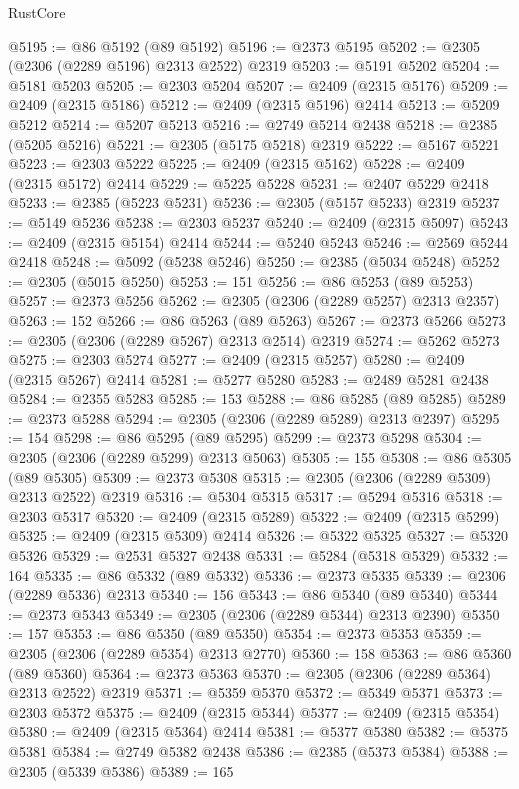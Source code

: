 \begin{lexlean}{RustCore}
\begin{coremodule}
@5195 := @86 @5192 (@89 @5192)
@5196 := @2373 @5195
@5202 := @2305 (@2306 (@2289 @5196) @2313 @2522) @2319
@5203 := @5191 @5202
@5204 := @5181 @5203
@5205 := @2303 @5204
@5207 := @2409 (@2315 @5176)
@5209 := @2409 (@2315 @5186)
@5212 := @2409 (@2315 @5196) @2414
@5213 := @5209 @5212
@5214 := @5207 @5213
@5216 := @2749 @5214 @2438
@5218 := @2385 (@5205 @5216)
@5221 := @2305 (@5175 @5218) @2319
@5222 := @5167 @5221
@5223 := @2303 @5222
@5225 := @2409 (@2315 @5162)
@5228 := @2409 (@2315 @5172) @2414
@5229 := @5225 @5228
@5231 := @2407 @5229 @2418
@5233 := @2385 (@5223 @5231)
@5236 := @2305 (@5157 @5233) @2319
@5237 := @5149 @5236
@5238 := @2303 @5237
@5240 := @2409 (@2315 @5097)
@5243 := @2409 (@2315 @5154) @2414
@5244 := @5240 @5243
@5246 := @2569 @5244 @2418
@5248 := @5092 (@5238 @5246)
@5250 := @2385 (@5034 @5248)
@5252 := @2305 (@5015 @5250)
@5253 := 151
@5256 := @86 @5253 (@89 @5253)
@5257 := @2373 @5256
@5262 := @2305 (@2306 (@2289 @5257) @2313 @2357)
@5263 := 152
@5266 := @86 @5263 (@89 @5263)
@5267 := @2373 @5266
@5273 := @2305 (@2306 (@2289 @5267) @2313 @2514) @2319
@5274 := @5262 @5273
@5275 := @2303 @5274
@5277 := @2409 (@2315 @5257)
@5280 := @2409 (@2315 @5267) @2414
@5281 := @5277 @5280
@5283 := @2489 @5281 @2438
@5284 := @2355 @5283
@5285 := 153
@5288 := @86 @5285 (@89 @5285)
@5289 := @2373 @5288
@5294 := @2305 (@2306 (@2289 @5289) @2313 @2397)
@5295 := 154
@5298 := @86 @5295 (@89 @5295)
@5299 := @2373 @5298
@5304 := @2305 (@2306 (@2289 @5299) @2313 @5063)
@5305 := 155
@5308 := @86 @5305 (@89 @5305)
@5309 := @2373 @5308
@5315 := @2305 (@2306 (@2289 @5309) @2313 @2522) @2319
@5316 := @5304 @5315
@5317 := @5294 @5316
@5318 := @2303 @5317
@5320 := @2409 (@2315 @5289)
@5322 := @2409 (@2315 @5299)
@5325 := @2409 (@2315 @5309) @2414
@5326 := @5322 @5325
@5327 := @5320 @5326
@5329 := @2531 @5327 @2438
@5331 := @5284 (@5318 @5329)
@5332 := 164
@5335 := @86 @5332 (@89 @5332)
@5336 := @2373 @5335
@5339 := @2306 (@2289 @5336) @2313
@5340 := 156
@5343 := @86 @5340 (@89 @5340)
@5344 := @2373 @5343
@5349 := @2305 (@2306 (@2289 @5344) @2313 @2390)
@5350 := 157
@5353 := @86 @5350 (@89 @5350)
@5354 := @2373 @5353
@5359 := @2305 (@2306 (@2289 @5354) @2313 @2770)
@5360 := 158
@5363 := @86 @5360 (@89 @5360)
@5364 := @2373 @5363
@5370 := @2305 (@2306 (@2289 @5364) @2313 @2522) @2319
@5371 := @5359 @5370
@5372 := @5349 @5371
@5373 := @2303 @5372
@5375 := @2409 (@2315 @5344)
@5377 := @2409 (@2315 @5354)
@5380 := @2409 (@2315 @5364) @2414
@5381 := @5377 @5380
@5382 := @5375 @5381
@5384 := @2749 @5382 @2438
@5386 := @2385 (@5373 @5384)
@5388 := @2305 (@5339 @5386)
@5389 := 165

\end{coremodule}
\end{lexlean}
